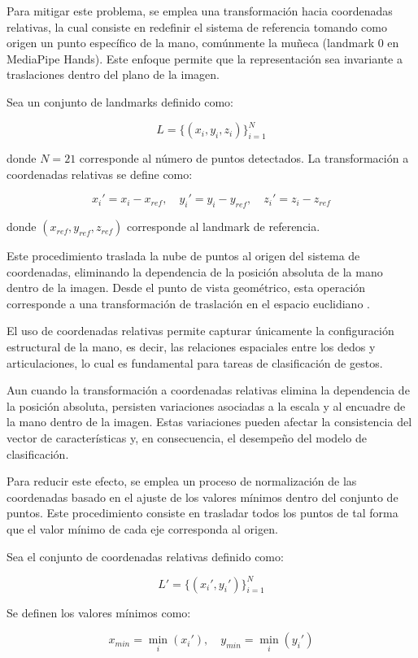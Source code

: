 	Para mitigar este problema, se emplea una transformación hacia coordenadas relativas, la cual consiste en redefinir el sistema de referencia tomando como origen un punto específico de la mano, comúnmente la muñeca (landmark 0 en MediaPipe Hands). Este enfoque permite que la representación sea invariante a traslaciones dentro del plano de la imagen.
	
	Sea un conjunto de landmarks definido como:
	
	\[
	L = \{(x_i, y_i, z_i)\}_{i=1}^{N}
	\]
	
	donde \( N = 21 \) corresponde al número de puntos detectados. La transformación a coordenadas relativas se define como:
	
	\[
	x_i' = x_i - x_{ref}, \quad y_i' = y_i - y_{ref}, \quad z_i' = z_i - z_{ref}
	\]
	
	donde \((x_{ref}, y_{ref}, z_{ref})\) corresponde al landmark de referencia.
	
	Este procedimiento traslada la nube de puntos al origen del sistema de coordenadas, eliminando la dependencia de la posición absoluta de la mano dentro de la imagen. Desde el punto de vista geométrico, esta operación corresponde a una transformación de traslación en el espacio euclidiano \cite{szeliski2010computer}.
	
	El uso de coordenadas relativas permite capturar únicamente la configuración estructural de la mano, es decir, las relaciones espaciales entre los dedos y articulaciones, lo cual es fundamental para tareas de clasificación de gestos.
	
	
	Aun cuando la transformación a coordenadas relativas elimina la dependencia de la posición absoluta, persisten variaciones asociadas a la escala y al encuadre de la mano dentro de la imagen. Estas variaciones pueden afectar la consistencia del vector de características y, en consecuencia, el desempeño del modelo de clasificación.
	
	Para reducir este efecto, se emplea un proceso de normalización de las coordenadas basado en el ajuste de los valores mínimos dentro del conjunto de puntos. Este procedimiento consiste en trasladar todos los puntos de tal forma que el valor mínimo de cada eje corresponda al origen.
	
	Sea el conjunto de coordenadas relativas definido como:
	
	\[
	L' = \{(x_i', y_i')\}_{i=1}^{N}
	\]
	
	Se definen los valores mínimos como:
	
	\[
	x_{min} = \min_{i}(x_i'), \quad y_{min} = \min_{i}(y_i')
	\]
	
